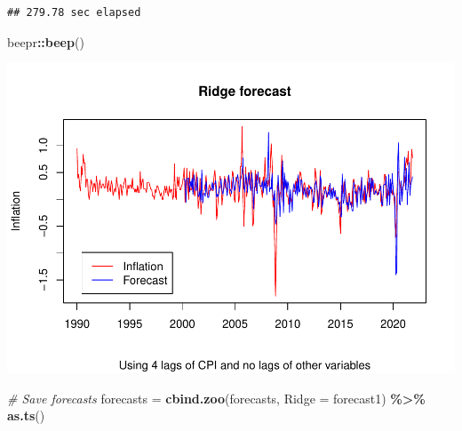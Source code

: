 \documentclass[
]{article}
\newenvironment{Shaded}{\begin{snugshade}}{\end{snugshade}}
\newcommand{\AttributeTok}[1]{\textcolor[rgb]{0.13,0.29,0.53}{#1}}
\newcommand{\CommentTok}[1]{\textcolor[rgb]{0.56,0.35,0.01}{\textit{#1}}}
\newcommand{\DecValTok}[1]{\textcolor[rgb]{0.00,0.00,0.81}{#1}}
\newcommand{\FunctionTok}[1]{\textcolor[rgb]{0.13,0.29,0.53}{\textbf{#1}}}
\newcommand{\NormalTok}[1]{#1}
\newcommand{\OtherTok}[1]{\textcolor[rgb]{0.56,0.35,0.01}{#1}}
\newcommand{\SpecialCharTok}[1]{\textcolor[rgb]{0.81,0.36,0.00}{\textbf{#1}}}
\begin{document}
\begin{Shaded}
\end{Shaded}

\begin{verbatim}
## 279.78 sec elapsed
\end{verbatim}

\begin{Shaded}
\begin{Highlighting}[]
\NormalTok{beepr}\SpecialCharTok{::}\FunctionTok{beep}\NormalTok{()}
\end{Highlighting}
\end{Shaded}

\includegraphics{Trabalho_Econo4_Q2_files/figure-latex/unnamed-chunk-21-1.pdf}

\begin{Shaded}
\begin{Highlighting}[]
\CommentTok{\# Save forecasts}
\NormalTok{forecasts }\OtherTok{=} \FunctionTok{cbind.zoo}\NormalTok{(forecasts, }\AttributeTok{Ridge =}\NormalTok{ forecast1) }\SpecialCharTok{\%\textgreater{}\%} \FunctionTok{as.ts}\NormalTok{()}
\end{Highlighting}
\end{Shaded}
\end{document}
